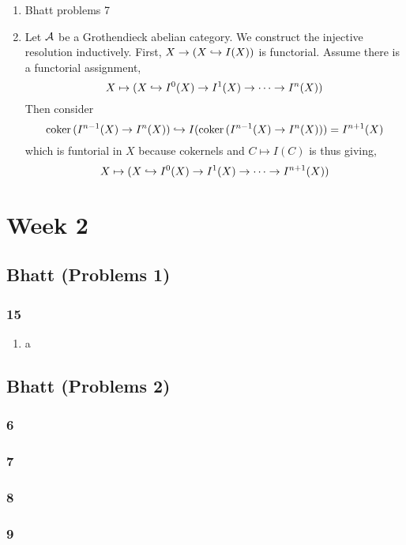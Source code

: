 \documentclass[12pt]{article}
\begin{document}
\begin{enumerate}
\item Bhatt problems 7

\item Let $\mathcal{A}$ be a Grothendieck abelian category. We construct the injective resolution inductively. First, $X \to (X \hookrightarrow I(X))$ is functorial. Assume there is a functorial assignment,
\[ X \mapsto (X \hookrightarrow I^0(X) \to I^1(X) \to \cdots \to I^n(X)) \]
Then consider 
\[ \operatorname{\mathrm{coker}}{(I^{n-1}(X) \to I^n(X))} \hookrightarrow I(\operatorname{\mathrm{coker}}{(I^{n-1}(X) \to I^n(X))}) = I^{n+1}(X) \]
which is funtorial in $X$ because cokernels and $C \mapsto I(C)$ is thus giving,
\[ X \mapsto (X \hookrightarrow I^0(X) \to I^1(X) \to \cdots \to I^{n+1}(X)) \]
\end{enumerate}


\section{Week 2}

\subsection{Bhatt (Problems 1)}

\subsubsection*{15}

\begin{enumerate}
\item a
\end{enumerate}

\subsection{Bhatt (Problems 2)}


\subsubsection*{6}


\subsubsection*{7}


\subsubsection*{8}


\subsubsection*{9}
\end{document}
